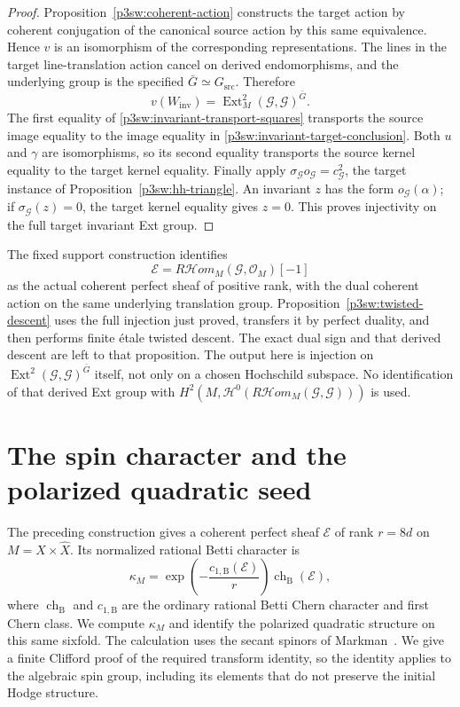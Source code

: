 \documentclass[11pt]{article}
\numberwithin{equation}{section}
\begin{document}
\begin{proof}
Proposition~\ref{p3sw:coherent-action} constructs the target action by
coherent conjugation of the canonical source action by this same
equivalence.  Hence \(v\) is an isomorphism of the corresponding
representations.  The lines in the target line-translation action
cancel on derived endomorphisms, and the underlying group is the
specified \(\bar G\simeq G_{\mathrm{src}}\).  Therefore
\[
 v(W_{\mathrm{inv}})
 =\operatorname{Ext}^2_M(\mathcal G,\mathcal G)^{\bar G}.
\]
The first equality of \eqref{p3sw:invariant-transport-squares} transports
the source image equality to the image equality in
\eqref{p3sw:invariant-target-conclusion}.  Both \(u\) and \(\gamma\) are
isomorphisms, so its second equality transports the source kernel
equality to the target kernel equality.  Finally apply
\(\sigma_{\mathcal G}o_{\mathcal G}=c_{\mathcal G}^2\), the target
instance of Proposition~\ref{p3sw:hh-triangle}.  An invariant \(z\)
has the form \(o_{\mathcal G}(\alpha)\); if
\(\sigma_{\mathcal G}(z)=0\), the target kernel equality gives \(z=0\).
This proves injectivity on the full target invariant Ext group.
\end{proof}

The fixed support construction identifies
\[
 \mathcal E=R\mathcal{H}om_M(\mathcal G,\mathcal O_M)[-1]
\]
as the actual coherent perfect sheaf of positive rank, with the
dual coherent action on the same underlying translation group.
Proposition~\ref{p3sw:twisted-descent} uses the full injection just
proved, transfers it by perfect duality, and then performs finite
\'etale twisted descent.  The exact dual sign and that derived descent
are left to that proposition.  The output here is injection on
\(\operatorname{Ext}^2(\mathcal G,\mathcal G)^{\bar G}\) itself, not
only on a chosen Hochschild subspace.  No identification of that
derived Ext group with
\(H^2(M,\mathcal H^0(R\mathcal{H}om_M(\mathcal G,\mathcal G)))\)
is used.
\section{The spin character and the polarized quadratic seed}
\label{p3:sec:spin}
\label{p3sw:spin-seed}

The preceding construction gives a coherent perfect sheaf
\(\mathcal E\) of rank \(r=8d\) on \(M=X\times\widehat X\).
Its normalized rational Betti character is
\begin{equation}
\label{p3sw:spin-eq:normalized-character}
 \kappa_M
   =\exp\!\left(-\frac{c_{1,\mathrm B}(\mathcal E)}r\right)
             \operatorname{ch}_{\mathrm B}(\mathcal E),
\end{equation}
where \(\operatorname{ch}_{\mathrm B}\) and \(c_{1,\mathrm B}\)
are the ordinary rational Betti Chern character and first Chern class.
We compute \(\kappa_M\) and identify the polarized quadratic structure
on this same sixfold.
The calculation uses the secant spinors of
Markman~\cite[Sections~2.4 and~6]{Markman2025Secant}.
We give a finite Clifford proof of the required transform identity,
so the identity applies to the algebraic spin group, including its
elements that do not preserve the initial Hodge structure.
\end{document}
